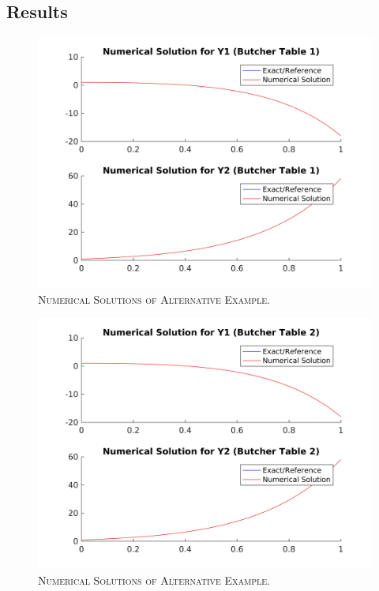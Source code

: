 \documentclass[a4paper,oneside]{book}
\numberwithin{equation}{chapter}
\begin{document}
\subsection{Results}
\begin{figure}[H]
\centering
\includegraphics[scale=0.09]{3ns1}
\caption{\textsc{Numerical Solutions of Alternative Example.}}
\end{figure}
\begin{figure}[H]
\centering
\includegraphics[scale=0.09]{3ns2}
\caption{\textsc{Numerical Solutions of Alternative Example.}}
\end{figure}
\end{document}
